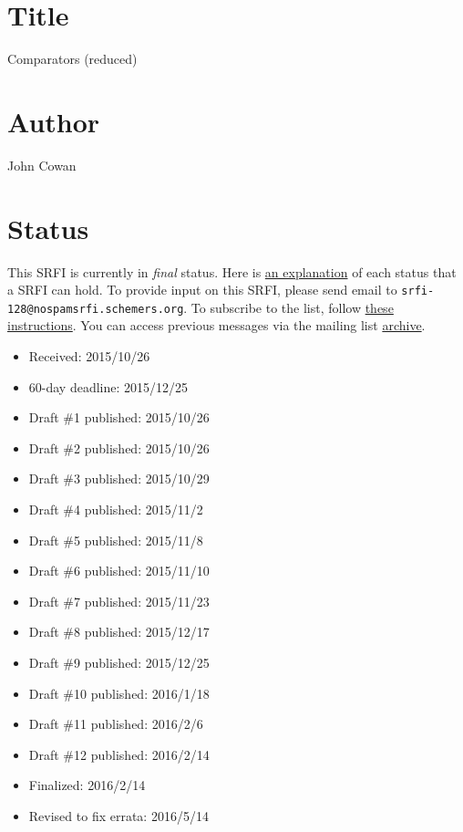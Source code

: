 \section{Title}\label{title}

Comparators (reduced)

\section{Author}\label{author}

John Cowan

\section{Status}\label{status}

This SRFI is currently in \emph{final} status. Here is
\href{http://srfi.schemers.org/srfi-process.html}{an explanation} of
each status that a SRFI can hold. To provide input on this SRFI, please
send email to \texttt{srfi-128@nospamsrfi.schemers.org}. To subscribe to
the list, follow
\href{http://srfi.schemers.org/srfi-list-subscribe.html}{these
instructions}. You can access previous messages via the mailing list
\href{http://srfi-email.schemers.org/srfi-128}{archive}.

\begin{itemize}
\tightlist
\item
  Received: 2015/10/26
\item
  60-day deadline: 2015/12/25
\item
  Draft \#1 published: 2015/10/26
\item
  Draft \#2 published: 2015/10/26
\item
  Draft \#3 published: 2015/10/29
\item
  Draft \#4 published: 2015/11/2
\item
  Draft \#5 published: 2015/11/8
\item
  Draft \#6 published: 2015/11/10
\item
  Draft \#7 published: 2015/11/23
\item
  Draft \#8 published: 2015/12/17
\item
  Draft \#9 published: 2015/12/25
\item
  Draft \#10 published: 2016/1/18
\item
  Draft \#11 published: 2016/2/6
\item
  Draft \#12 published: 2016/2/14
\item
  Finalized: 2016/2/14
\item
  Revised to fix errata: 2016/5/14
\end{itemize}

